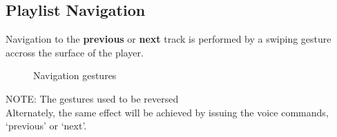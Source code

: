 \documentclass[12pt,letterpaper]{article}
\begin{document}
\subsection*{Playlist Navigation}
Navigation to the \textbf{previous} or \textbf{next} track is performed by a swiping gesture accross the surface of the player.
	\begin{figure}[H]
		\centering
		\hspace{1in}
		\caption{Navigation gestures}
	\end{figure}
{\color{green}NOTE: The gestures used to be reversed} \\
Alternately, the same effect will be achieved by issuing the voice commands, `previous' or `next'. \\
\end{document}
